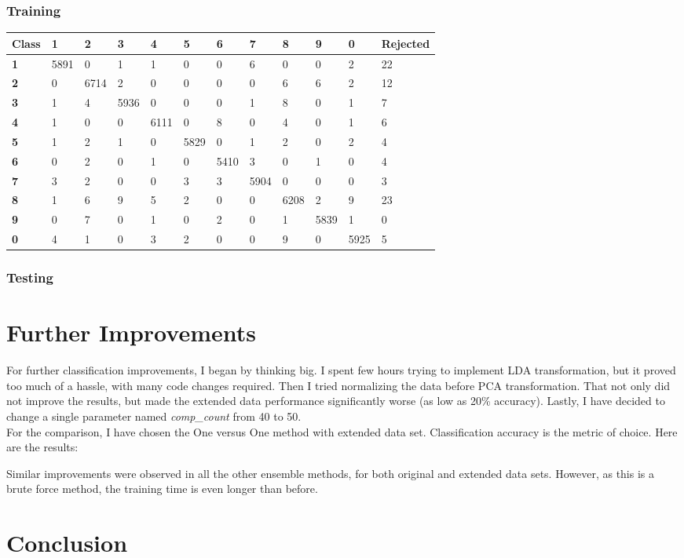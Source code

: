 \documentclass[
  a4paper,            %
  DIV=10,             %
  oneside,            %
  BCOR=5mm,           %
  parskip=half,       %
  numbers=noenddot,   %
  bibtotoc,           %
  listof=totoc,        %
  article
]{scrreprt}
\begin{document}
\subsubsection{Training}
\begin{center}
  \begin{tabular}{|p{1cm}|p{1cm}|p{1cm}|p{1cm}|p{1cm}|p{1cm}|p{1cm}|p{1cm}|p{1cm}|p{1cm}|p{1cm}|p{1.7cm}|}
    \hline
    \textbf{Class} & \textbf{1} & \textbf{2} & \textbf{3} & \textbf{4} & \textbf{5} & \textbf{6} & \textbf{7} & \textbf{8} & \textbf{9} & \textbf{0} & \textbf{Rejected} \\
    \hline
    \textbf{1} & 5891 & 0 & 1 & 1 & 0 & 0 & 6 & 0 & 0 & 2 & 22 \\
    \hline
    \textbf{2} & 0 & 6714 & 2 & 0 & 0 & 0 & 0 & 6 & 6 & 2 & 12 \\
    \hline
    \textbf{3} & 1 & 4 & 5936 & 0 & 0 & 0 & 1 & 8 & 0 & 1 & 7 \\
    \hline
    \textbf{4} & 1 & 0 & 0 & 6111 & 0 & 8 & 0 & 4 & 0 & 1 & 6 \\
    \hline
    \textbf{5} & 1 & 2 & 1 & 0 & 5829 & 0 & 1 & 2 & 0 & 2 & 4 \\
    \hline
    \textbf{6} & 0 & 2 & 0 & 1 & 0 & 5410 & 3 & 0 & 1 & 0 & 4 \\
    \hline
    \textbf{7} & 3 & 2 & 0 & 0 & 3 & 3 & 5904 & 0 & 0 & 0 & 3 \\
    \hline
    \textbf{8} & 1 & 6 & 9 & 5 & 2 & 0 & 0 & 6208 & 2 & 9 & 23 \\
    \hline
    \textbf{9} & 0 & 7 & 0 & 1 & 0 & 2 & 0 & 1 & 5839 & 1 & 0 \\
    \hline
    \textbf{0} & 4 & 1 & 0 & 3 & 2 & 0 & 0 & 9 & 0 & 5925 & 5 \\
    \hline
  \end{tabular}
\end{center}
\subsubsection{Testing}

\section{Further Improvements}
For further classification improvements, I began by thinking big.
I spent few hours trying to implement LDA transformation, but it proved too much of a hassle, with many code changes required.
Then I tried normalizing the data before PCA transformation.
That not only did not improve the results, but made the extended data performance significantly worse (as low as 20\% accuracy).
Lastly, I have decided to change a single parameter named \textit{comp\_count} from 40 to 50.
\\
For the comparison, I have chosen the One versus One method with extended data set.
Classification accuracy is the metric of choice.
Here are the results:


Similar improvements were observed in all the other ensemble methods, for both original and extended data sets.
However, as this is a brute force method, the training time is even longer than before.
\section{Conclusion}
\end{document}
